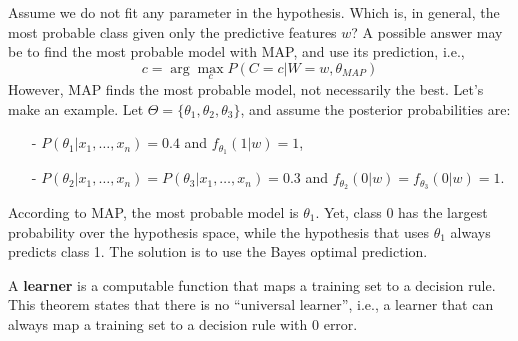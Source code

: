 Assume we do not fit any parameter in the hypothesis. Which is, in general, the most probable class given only the predictive features $w$? A possible answer may be to find the most probable model with MAP, and use its prediction, i.e.,
\begin{equation*}
    c = \arg \max_c P(C = c | W = w, \theta_{MAP})
\end{equation*}
However, MAP finds the most probable model, not necessarily the best. Let's make an example. Let $\Theta = \{\theta_1, \theta_2, \theta_3\}$, and assume the posterior probabilities are:
\begin{itemize}[itemsep=0pt]
    \item[-] $P(\theta_1 | x_1, \ldots, x_n) = 0.4$ and $f_{\theta_1}(1|w) = 1$,
    \item[-] $P(\theta_2 | x_1, \ldots, x_n) = P(\theta_3 | x_1, \ldots, x_n) = 0.3$ and $f_{\theta_2} (0|w) = f_{\theta_3}(0|w) = 1$.
\end{itemize}
According to MAP, the most probable model is $\theta_1$. Yet, class 0 has the largest probability over the hypothesis space, while the hypothesis that uses $\theta_1$ always predicts class 1. The solution is to use the Bayes optimal prediction.

A \textbf{learner} is a computable function that maps a training set to a decision rule.
This theorem states that there is no ``universal learner'', i.e., a learner that can always map a training set to a decision rule with 0 error.

